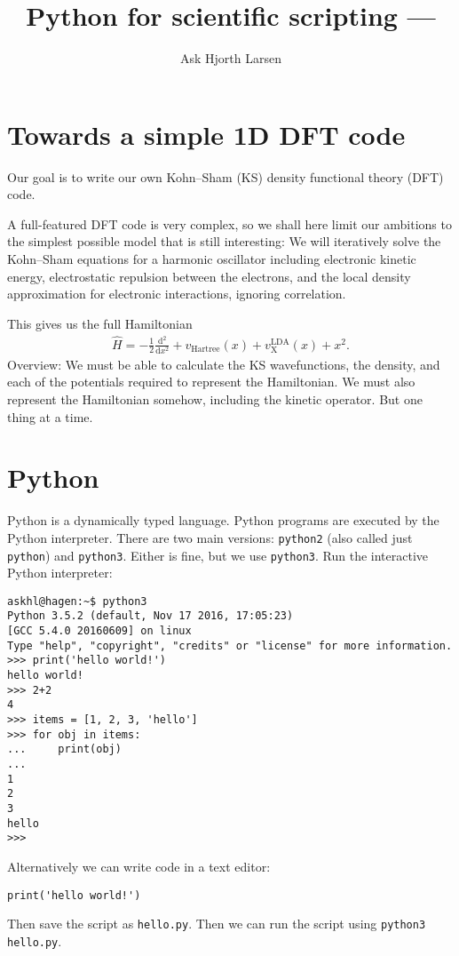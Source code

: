 \documentclass{article}
\title{Python for scientific scripting --- }
\author{Ask Hjorth Larsen}
\newcommand{\dee}[0]{\mathrm d}
\newcommand{\diff}[2]{\frac{\dee #1}{\dee #2}}
\newcommand{\Ha}[0]{\mathrm{Hartree}}
\begin{document}
\section{Towards a simple 1D DFT code}

Our goal is to write our own Kohn--Sham (KS) density functional theory
(DFT) code.


A full-featured DFT code is very complex, so we shall here limit our ambitions
to the simplest possible model that is still interesting:
We will iteratively solve the Kohn--Sham
equations for a harmonic oscillator including electronic kinetic
energy, electrostatic repulsion between the electrons, and the
local density approximation for electronic interactions, ignoring correlation.

This gives us the full Hamiltonian
\begin{align}
\hat H = -\frac12 \diff{^2}{x^2} + v_\Ha(x) + v_{\mathrm X}^{\mathrm{LDA}}(x) + x^2.
\end{align}
Overview: We must be able to calculate the KS wavefunctions, the
density, and each of the potentials required to represent the
Hamiltonian.  We must also represent the Hamiltonian somehow,
including the kinetic operator.  But one thing at a time.

\section{Python}
Python is a dynamically typed language.  Python programs are executed
by the Python interpreter.
There are two main versions:
\texttt{python2} (also called just \texttt{python}) and \texttt{python3}.
Either is fine, but we use \texttt{python3}.
Run the interactive Python interpreter:

\begin{verbatim}
askhl@hagen:~$ python3
Python 3.5.2 (default, Nov 17 2016, 17:05:23)
[GCC 5.4.0 20160609] on linux
Type "help", "copyright", "credits" or "license" for more information.
>>> print('hello world!')
hello world!
>>> 2+2
4
>>> items = [1, 2, 3, 'hello']
>>> for obj in items:
...     print(obj)
...
1
2
3
hello
>>>
\end{verbatim}

Alternatively we can write code in a text editor:
\begin{lstlisting}
print('hello world!')
\end{lstlisting}
Then save the script as \texttt{hello.py}.  Then we can run the script using
\texttt{python3 hello.py}.
\end{document}
